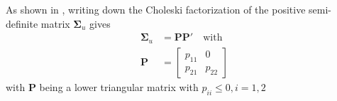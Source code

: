 \documentclass[a4paper,11pt,listof=nochaptergap,oneside,pointednumbers,bibtotoc,bigheadings,liststotoc,hidelinks]{scrbook}
\theoremstyle{mysatz}
\theoremstyle{mydefinition}
\theoremstyle{mytheorem}
\theoremstyle{mybemerkung}
\newcommand{\vect}[1]{\boldsymbol{\mathbf{#1}}}
\begin{document}
As shown in \citet{zivot:00}, writing down the Choleski factorization of the positive semi-definite matrix $\vect{\Sigma}_u$ gives
\begin{equation} \label{eq:svar14}
\begin{split}
 		\vect{\Sigma}_u & = \vect{P}\vect{P'} \quad \text{with} \\
		\vect{P} & = \begin{bmatrix}
    							p_{11} & 0 \\
							p_{21} & p_{22}
 							\end{bmatrix}
\end{split}								
\end{equation}
with $\vect{P}$ being a lower triangular matrix with $p_{ii} \leq 0, i = 1, 2$
\end{document}
